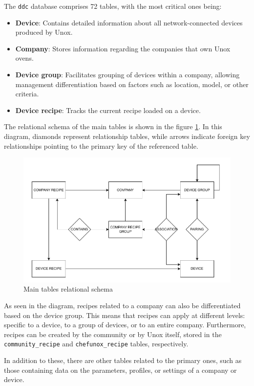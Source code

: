 The \texttt{ddc} database comprises 72 tables, with the most critical ones being:
\begin{itemize}
    \item \textbf{Device}: Contains detailed information about all network-connected devices produced by Unox.
    \item \textbf{Company}: Stores information regarding the companies that own Unox ovens.
    \item \textbf{Device group}: Facilitates grouping of devices within a company, allowing management differentiation based on factors such as location, model, or other criteria.
    \item \textbf{Device recipe}: Tracks the current recipe loaded on a device.
\end{itemize}
The relational schema of the main tables is shown in the figure \ref{fig:relschema}. In this diagram, diamonds represent relationship tables, while arrows indicate foreign key relationships pointing to the primary key of the referenced table.
\begin{figure}[H]
    \centering
    \includegraphics[width=1\textwidth]{res/db-schema.pdf}
    \caption{Main tables relational schema}
    \label{fig:relschema}
\end{figure}
As seen in the diagram, recipes related to a company can also be differentiated based on the device group. This means that recipes can apply at different levels: specific to a device, to a group of devices, or to an entire company. Furthermore, recipes can be created by the community or by Unox itself, stored in the \texttt{community\_recipe} and \texttt{chefunox\_recipe} tables, respectively.

In addition to these, there are other tables related to the primary ones, such as those containing data on the parameters, profiles, or settings of a company or device.

